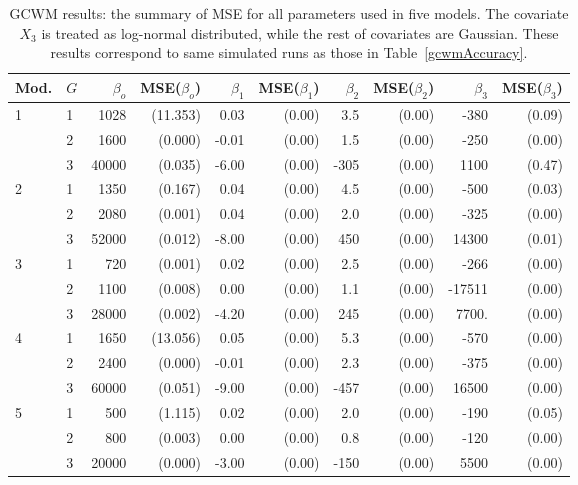 \documentclass[12pt,letterpaper]{article}
\numberwithin{equation}{section}
\numberwithin{equation}{section}
\numberwithin{equation}{section}
\begin{document}
\begin{table}[h!]
\centering
\caption{ GCWM results: the summary of MSE for all parameters used in five models. The covariate $X_3$ is treated as log-normal distributed, while the rest of covariates are Gaussian. These results correspond to same simulated runs as those in Table~\ref{gcwmAccuracy}.}
\label{mseTable}
\begin{tabular}{ll|rrrrrrrr}
\hline
Mod. & $G$ & $\beta_o$ &  MSE($\beta_o$)   &  $\beta_1$ & MSE($\beta_1$)& $\beta_2$ &MSE($\beta_2$)   & $\beta_3$ &  MSE($\beta_3$)  \\
\hline
1     & 1         & 1028& (11.353)   & 0.03& (0.00)  & 3.5& (0.00)    & -380& (0.09)   \\
      & 2         & 1600& (0.000)     & -0.01&(0.00) & 1.5&(0.00)    & -250&(0.00)   \\
      & 3         & 40000&(0.035)    & -6.00&(0.00) & -305&(0.00) & 1100&(0.47)   \\
\hline
2     & 1         & 1350&(0.167)     & 0.04&(0.00)  & 4.5&(0.00)    & -500&(0.03)   \\
      & 2         & 2080& (0.001)     & 0.04&(0.00)  & 2.0&(0.00)    & -325&(0.00)   \\
      & 3         & 52000& (0.012)    & -8.00&(0.00) & 450&(0.00)  & 14300&(0.01)  \\
\hline
3     & 1         & 720& (0.001)      & 0.02&(0.00)  & 2.5&(0.00)   & -266&(0.00)   \\
      & 2         & 1100& (0.008)     & 0.00&(0.00)  & 1.1&(0.00)    & -17511&(0.00) \\
      & 3         & 28000& (0.002)    & -4.20&(0.00) & 245&(0.00)  & 7700.&(0.00) \\
\hline
4     & 1         & 1650&(13.056)   & 0.05&(0.00)  & 5.3&(0.00)    & -570&(0.00)   \\
      & 2         & 2400& (0.000)     & -0.01&(0.00) & 2.3&(0.00)    & -375&(0.00)   \\
      & 3         & 60000& (0.051)    & -9.00&(0.00) & -457&(0.00) & 16500&(0.00)  \\
\hline
5     & 1         & 500& (1.115)     & 0.02&(0.00)  & 2.0&(0.00)    & -190&(0.05)   \\
      & 2         & 800& (0.003)      & 0.00&(0.00)  & 0.8&(0.00)    & -120&(0.00)   \\
      & 3         & 20000& (0.000)    & -3.00&(0.00) & -150&(0.00) & 5500&(0.00)  \\
      \hline
\end{tabular}
\end{table}
\end{document}

